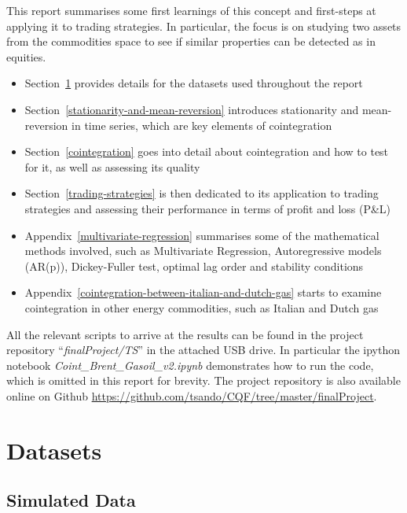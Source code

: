 \documentclass[11pt]{article}
\providecommand{\tightlist}{%
      \setlength{\itemsep}{0pt}\setlength{\parskip}{0pt}}
\begin{document}
    This report summarises some first learnings of this concept and first-steps at applying it to trading strategies. In particular, the focus is on studying two assets from the commodities space to see if similar properties can be detected as in equities.
    
\begin{itemize}
\tightlist
\item
  Section~\ref{datasets} provides details for the datasets used throughout the report
\item
  Section~\ref{stationarity-and-mean-reversion} introduces stationarity and mean-reversion in time series, which are key elements of cointegration
\item 
 Section~\ref{cointegration} goes into detail about cointegration and how to test for it,  as well as assessing its quality
\item
  Section~\ref{trading-strategies} is then dedicated to its application  to
  trading strategies and assessing their performance in terms of profit
  and loss (P\&L)
\item Appendix~\ref{multivariate-regression} summarises some of the mathematical methods
  involved, such as Multivariate Regression, Autoregressive models (AR(p)), Dickey-Fuller test, optimal lag order and stability conditions

\item Appendix~\ref{cointegration-between-italian-and-dutch-gas}  starts to examine  cointegration in other energy commodities, such as  Italian and Dutch gas

\end{itemize}

All the relevant scripts  to arrive at the results can be found in the project repository ``\emph{finalProject/TS}'' in the attached USB drive. In particular the ipython notebook \emph{Coint\_Brent\_Gasoil\_v2.ipynb}  demonstrates how to run the code, which is omitted in this report for brevity. The project repository is also available online on Github \url{https://github.com/tsando/CQF/tree/master/finalProject}.


    \section{Datasets}\label{datasets}
    
    
    \subsection{Simulated Data}\label{simulated-data}
    
\end{document}
